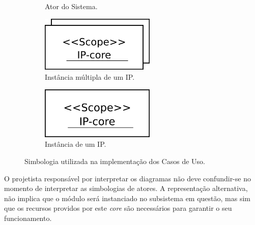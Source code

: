\documentclass{article}
\begin{document}
  \FloatBarrier
  \begin{figure}[H]
    \centering
    \begin{subfigure}[b]{0.3\textwidth}
      \centering
      \caption{Ator do Sistema.}
      \label{fig:actor_exemple}
    \end{subfigure} 
    \begin{subfigure}[b]{0.3\textwidth}
      \centering
      \includegraphics[width=0.6\textwidth]{ipcore_exemple.png}
      \caption{Instância múltipla de um IP.}
      \label{fig:ipcore_exemple}
    \end{subfigure}
    \begin{subfigure}[b]{0.3\textwidth}
      \centering
      \includegraphics[width=0.6\textwidth]{ipcore_single_exemple.png}
      \caption{Instância de um IP.}
      \label{fig:ipcore_single_exemple}
    \end{subfigure}
    \caption{Simbologia utilizada na implementação dos Casos de Uso.}
    \label{fig:actors}
  \end{figure}
  
  O projetista responsável por interpretar os diagramas não deve confundir-se no momento de interpretar as simbologias de atores. A representação alternativa, não implica que o módulo será instanciado no subsistema em questão, mas sim que os recursos providos por este \textit{core} são necessários para garantir o seu funcionamento.
  
\end{document}
